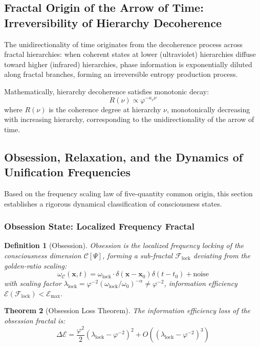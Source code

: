 \documentclass[12pt,a4paper,twocolumn]{article}
\renewcommand{\phi}{\varphi}
\newtheorem{theorem}{Theorem}[section]
\newtheorem{definition}[theorem]{Definition}
\begin{document}
\subsection{Fractal Origin of the Arrow of Time: Irreversibility of Hierarchy Decoherence}
\label{subsec:time_arrow}
The unidirectionality of time originates from the decoherence process across fractal hierarchies: when coherent states at lower (ultraviolet) hierarchies diffuse toward higher (infrared) hierarchies, phase information is exponentially diluted along fractal branches, forming an irreversible entropy production process.

Mathematically, hierarchy decoherence satisfies monotonic decay:
\[
R(\nu) \propto \phi^{-\kappa_\nu \nu}
\]
where $R(\nu)$ is the coherence degree at hierarchy $\nu$, monotonically decreasing with increasing hierarchy, corresponding to the unidirectionality of the arrow of time.

\subsection{Obsession, Relaxation, and the Dynamics of Unification Frequencies}
\label{subsec:obsession}

Based on the frequency scaling law of five-quantity common origin, this section establishes a rigorous dynamical classification of consciousness states.

\subsubsection{Obsession State: Localized Frequency Fractal}

\begin{definition}[Obsession]
Obsession is the localized frequency locking of the consciousness dimension $\mathcal{C}[\Psi]$, forming a sub-fractal $\mathcal{F}_{\text{lock}}$ deviating from the golden-ratio scaling:
\begin{equation}
\omega_{\mathcal{C}}(\mathbf{x},t) = \omega_{\text{lock}} \cdot \delta(\mathbf{x}-\mathbf{x}_0)\delta(t-t_0) + \text{noise}
\end{equation}
with scaling factor $\lambda_{\text{lock}} = \phi^{-2}(\omega_{\text{lock}}/\omega_0)^{-\alpha} \neq \phi^{-2}$, information efficiency $\mathcal{E}(\mathcal{F}_{\text{lock}}) < \mathcal{E}_{\max}$.
\end{definition}

\begin{theorem}[Obsession Loss Theorem]
The information efficiency loss of the obsession fractal is:
\begin{equation}
\Delta\mathcal{E} = \frac{\phi^2}{2}(\lambda_{\text{lock}} - \phi^{-2})^2 + O((\lambda_{\text{lock}} - \phi^{-2})^3)
\end{equation}
\end{theorem}
\end{document}
